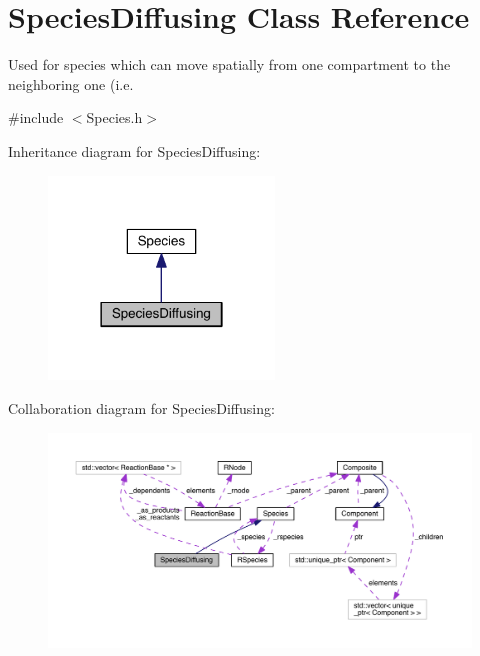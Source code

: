 \hypertarget{classSpeciesDiffusing}{\section{Species\+Diffusing Class Reference}
\label{classSpeciesDiffusing}
}


Used for species which can move spatially from one compartment to the neighboring one (i.\+e.  




{\ttfamily \#include $<$Species.\+h$>$}



Inheritance diagram for Species\+Diffusing\+:\nopagebreak
\begin{figure}[H]
\begin{center}
\leavevmode
\includegraphics[width=170pt]{classSpeciesDiffusing__inherit__graph}
\end{center}
\end{figure}


Collaboration diagram for Species\+Diffusing\+:\nopagebreak
\begin{figure}[H]
\begin{center}
\leavevmode
\includegraphics[width=350pt]{classSpeciesDiffusing__coll__graph}
\end{center}
\end{figure}
